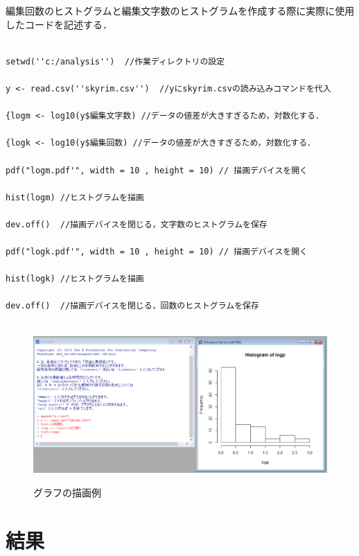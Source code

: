 編集回数のヒストグラムと編集文字数のヒストグラムを作成する際に実際に使用したコードを記述する．\\

\begin{verbatim}

setwd(''c:/analysis'')  //作業ディレクトリの設定

y <- read.csv(''skyrim.csv'')  //yにskyrim.csvの読み込みコマンドを代入

{logm <- log10(y$編集文字数) //データの値差が大きすぎるため，対数化する．

{logk <- log10(y$編集回数) //データの値差が大きすぎるため，対数化する．

pdf("logm.pdf'", width = 10 , height = 10) // 描画デバイスを開く

hist(logm) //ヒストグラムを描画

dev.off()  //描画デバイスを閉じる，文字数のヒストグラムを保存

pdf("logk.pdf'", width = 10 , height = 10) // 描画デバイスを開く

hist(logk) //ヒストグラムを描画

dev.off()  //描画デバイスを閉じる，回数のヒストグラムを保存

\end{verbatim}

\begin{figure}[htbp]
\centering　
\includegraphics[width=13cm]{rcmd.png}
\caption{グラフの描画例}
\end{figure}

\chapter{結果}

